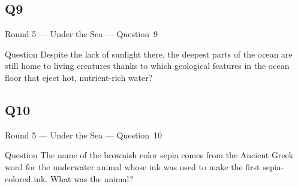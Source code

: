 \documentclass[11pt]{beamer}
\begin{document}
\subsection*{Q9}
\begin{frame}[t]{Round 5 --- Under the Sea --- \mbox{Question 9}}
\vspace{-0.5em}
\begin{block}{Question}
Despite the lack of sunlight there, the deepest parts of the ocean are still home to living creatures thanks to which geological features in the ocean floor that eject hot, nutrient-rich water?
\end{block}
\end{frame}
\subsection*{Q10}
\begin{frame}[t]{Round 5 --- Under the Sea --- \mbox{Question 10}}
\vspace{-0.5em}
\begin{block}{Question}
The name of the brownish color sepia comes from the Ancient Greek word for the underwater animal whose ink was used to make the first sepia-colored ink. What was the animal?
\end{block}
\end{frame}
\end{document}
